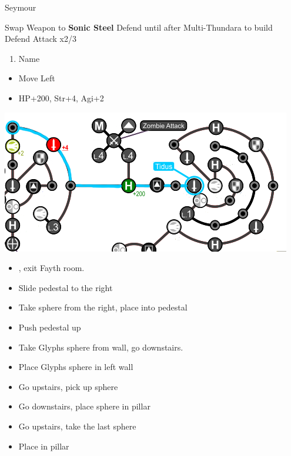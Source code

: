 \begin{battle}[6000]{Seymour}
  \begin{itemize}
    \tidusf Swap Weapon to \textbf{Sonic Steel}
    \tidusf Defend until after Multi-Thundara to build \rikku\ \od
    \rikkuf Defend
    \tidusf Attack x2/3
  \end{itemize}
\end{battle}
\begin{enumerate}[resume]
  \item Name \shiva
\end{enumerate}
\begin{spheregrid}
  \begin{itemize}
    \tidusf
    \begin{itemize}
      \item Move Left
      \item HP+200, Str+4, Agi+2
    \end{itemize}
    \includegraphics[width=.8\columnwidth]{graphics/Tidus_Post_Seymour}
  \end{itemize}
\end{spheregrid}
\begin{trial}
  \begin{itemize}
    \item \save, exit Fayth room.
    \item Slide pedestal to the right
    \item Take sphere from the right, place into pedestal
    \item Push pedestal up
    \item Take Glyphs sphere from wall, go downstairs.
    \item Place Glyphs sphere in left wall
    \item Go upstairs, pick up sphere
    \item Go downstairs, place sphere in pillar
    \item Go upstairs, take the last sphere
    \item Place in pillar
  \end{itemize}
\end{trial}
